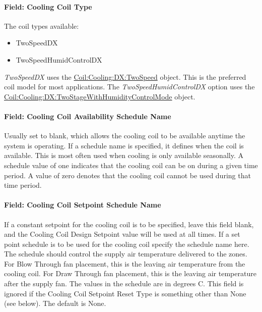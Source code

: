 \paragraph{Field: Cooling Coil Type}\label{field-cooling-coil-type-9}

The coil types available:

\begin{itemize}
\item
  TwoSpeedDX
\item
  TwoSpeedHumidControlDX
\end{itemize}

\emph{TwoSpeedDX} uses the \hyperref[coilcoolingdxtwospeed]{Coil:Cooling:DX:TwoSpeed} object. This is the preferred coil model for most applications. The \emph{TwoSpeedHumidControlDX} option uses the \hyperref[coilcoolingdxtwostagewithhumiditycontrolmode]{Coil:Cooling:DX:TwoStageWithHumidityControlMode} object.

\paragraph{Field: Cooling Coil Availability Schedule Name}\label{field-cooling-coil-availability-schedule-name-8}

Usually set to blank, which allows the cooling coil to be available anytime the system is operating. If a schedule name is specified, it defines when the coil is available. This is most often used when cooling is only available seasonally. A schedule value of one indicates that the cooling coil can be on during a given time period. A value of zero denotes that the cooling coil cannot be used during that time period.

\paragraph{Field: Cooling Coil Setpoint Schedule Name}\label{field-cooling-coil-setpoint-schedule-name-1}

If a constant setpoint for the cooling coil is to be specified, leave this field blank, and the Cooling Coil Design Setpoint value will be used at all times. If a set point schedule is to be used for the cooling coil specify the schedule name here. The schedule should control the supply air temperature delivered to the zones. For Blow Through fan placement, this is the leaving air temperature from the cooling coil. For Draw Through fan placement, this is the leaving air temperature after the supply fan. The values in the schedule are in degrees C. This field is ignored if the Cooling Coil Setpoint Reset Type is something other than None (see below). The default is None.

